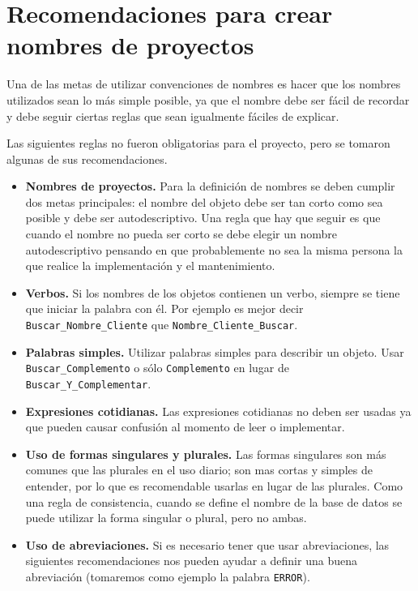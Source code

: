 \section{Recomendaciones para crear nombres de proyectos}

Una de las metas de utilizar convenciones de nombres es hacer que los nombres
utilizados sean lo más simple posible, ya que el nombre debe ser fácil de
recordar y debe seguir ciertas reglas que sean igualmente fáciles de explicar.

Las siguientes reglas no fueron obligatorias para el proyecto, pero se tomaron
algunas de sus recomendaciones.

\begin{itemize}

\item \textbf{Nombres de proyectos.} Para la definición de nombres se deben
  cumplir dos metas principales: el nombre del objeto debe ser tan corto como
  sea posible y debe ser autodescriptivo. Una regla que hay que seguir es que
  cuando el nombre no pueda ser corto se debe elegir un nombre autodescriptivo
  pensando en que probablemente no sea la misma persona la que realice la
  implementación y el mantenimiento.

\item \textbf{Verbos.} Si los nombres de los objetos contienen un verbo, siempre
  se tiene que iniciar la palabra con él. Por ejemplo es mejor decir
  \texttt{Buscar\_Nombre\_Cliente} que \texttt{Nombre\_Cliente\_Buscar}.

\item \textbf{Palabras simples.} Utilizar palabras simples para describir un
  objeto. Usar \texttt{Buscar\_Complemento} o sólo \texttt{Complemento} en lugar
  de \texttt{Buscar\_Y\-\_Complementar}.

\item \textbf{Expresiones cotidianas.} Las expresiones cotidianas no deben ser
  usadas ya que pueden causar confusión al momento de leer o implementar.

\item \textbf{Uso de formas singulares y plurales.} Las formas singulares son
  más comunes que las plurales en el uso diario; son mas cortas y simples de
  entender, por lo que es recomendable usarlas en lugar de las plurales. Como
  una regla de consistencia, cuando se define el nombre de la base de datos se
  puede utilizar la forma singular o plural, pero no ambas.

\item \textbf{Uso de abreviaciones.} Si es necesario tener que usar
  abreviaciones, las siguientes recomendaciones nos pueden ayudar a definir una
  buena abreviación (tomaremos como ejemplo la palabra \texttt{ERROR}).


\end{itemize}
